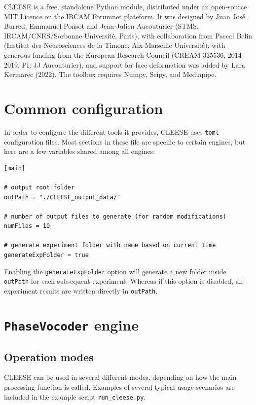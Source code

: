 \documentclass[oneside,10pt]{article}
\begin{document}
CLEESE is a free, standalone Python module, distributed under an open-source
MIT Licence on the IRCAM Forumnet plateform. It was designed by Juan José
Burred, Emmanuel Ponsot and Jean-Julien Aucouturier (STMS, IRCAM/CNRS/Sorbonne
Université, Paris), with collaboration from Pascal Belin (Institut des
Neurosciences de la Timone, Aix-Marseille Université), with generous funding
from the European Research Council (CREAM 335536, 2014--2019, PI: JJ
Aucouturier), and support for face deformation was added by Lara Kermarec
(2022). The toolbox requires Numpy, Scipy, and Mediapipe.



\section{Common configuration}\label{sec:common_conf}

In order to configure the different tools it provides, CLEESE uses
\texttt{toml} configuration files. Most sections in these file are specific to
certain engines, but here are a few variables shared among all engines:

\vspace{5pt}
\begin{verbatim}
[main]

# output root folder
outPath = "./CLEESE_output_data/"

# number of output files to generate (for random modifications)
numFiles = 10

# generate experiment folder with name based on current time
generateExpFolder = true
\end{verbatim}

Enabling the \texttt{generateExpFolder} option will generate a new folder
inside \texttt{outPath} for each subsequent experiment. Whereas if this option
is disabled, all experiment results are written directly in \texttt{outPath}.

\section{\texttt{PhaseVocoder} engine}
\subsection{Operation modes}

CLEESE can be used in several different modes, depending on how the main
processing function is called. Examples of several typical usage scenarios are
included in the example script \texttt{run\_cleese.py}.
\end{document}
